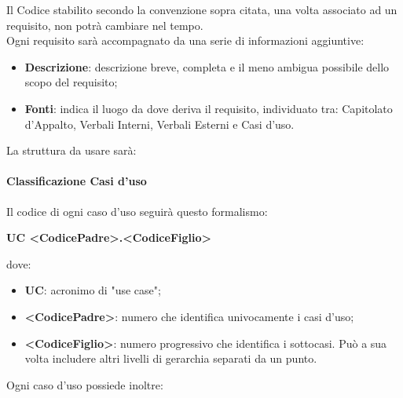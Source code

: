 				Il Codice stabilito secondo la convenzione sopra citata, una volta associato ad un requisito, non potrà cambiare nel tempo. \\
				Ogni requisito sarà accompagnato da una serie di informazioni aggiuntive:\\
				\begin{itemize}
					\item\textbf{Descrizione}: descrizione breve, completa e il meno ambigua possibile dello scopo del requisito;
					\item\textbf{Fonti}: indica il luogo da dove deriva il requisito, individuato tra: Capitolato d’Appalto, Verbali Interni, Verbali Esterni e Casi d’uso.
				\end{itemize}
				La struttura da usare sarà:\\
			\paragraph{Classificazione Casi d’uso}
				Il codice di ogni caso d'uso seguirà questo formalismo:
				\begin{center}
					\textbf{UC <CodicePadre>.<CodiceFiglio>}
				\end{center}
				dove:
				\begin{itemize}
					\item\textbf{UC}: acronimo di "use case";
					\item\textbf{<CodicePadre>}: numero che identifica univocamente i casi d'uso;
					\item\textbf{<CodiceFiglio>}: numero progressivo che identifica i sottocasi. Può a sua volta includere altri livelli di gerarchia separati da un punto.
				\end{itemize}
				Ogni caso d’uso possiede inoltre:
